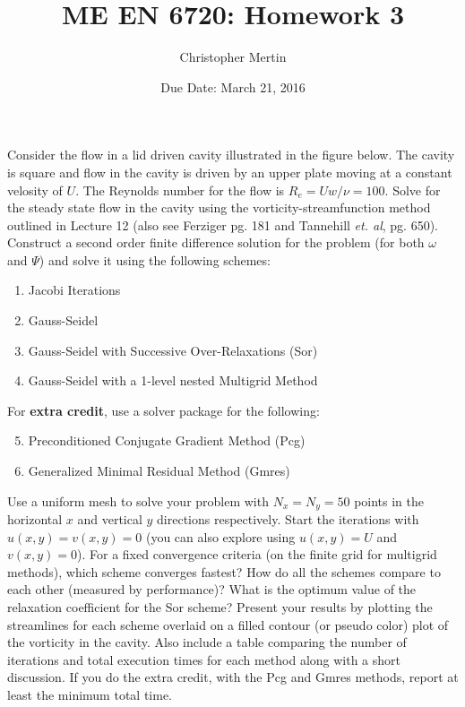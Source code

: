 \documentclass[addpoints]{exam}
\title{ME EN 6720: Homework 3}
\date{Due Date: March 21, 2016}
\author{Christopher Mertin}
\begin{document}
\maketitle

\pointname{}
\bonuspointname{}
\pointformat{[\bfseries\thepoints]}

\printanswers



\begin{questions}
Consider the flow in a lid driven cavity illustrated in the figure below. The cavity is square and flow in the cavity is driven by an upper plate moving at a constant velosity of $U$. The Reynolds number for the flow is $R_{e} = Uw/\nu = 100$. Solve for the steady state flow in the cavity using the vorticity-streamfunction method outlined in Lecture 12 (also see Ferziger pg. 181 and Tannehill {\em et. al}, pg. 650). Construct a second order finite difference solution for the problem (for both $\omega$ and $\Psi$) and solve it using the following schemes:
\begin{enumerate}
\item Jacobi Iterations
\item Gauss-Seidel
\item Gauss-Seidel with Successive Over-Relaxations ({\sc Sor})
\item Gauss-Seidel with a 1-level nested Multigrid Method
\end{enumerate}

For {\bf extra credit}, use a solver package for the following:
\begin{enumerate}
\setcounter{enumi}{4}
\item Preconditioned Conjugate Gradient Method ({\sc Pcg})
\item Generalized Minimal Residual Method ({\sc Gmres})
\end{enumerate}

Use a uniform mesh to solve your problem with $N_{x}=N_{y}=50$ points in the horizontal $x$ and vertical $y$ directions respectively. Start the iterations with $u(x,y)=v(x,y)=0$ (you can also explore using $u(x,y)=U$ and $v(x,y)=0$). For a fixed convergence criteria (on the finite grid for multigrid methods), which scheme converges fastest? How do all the schemes compare to each other (measured by performance)? What is the optimum value of the relaxation coefficient for the {\sc Sor} scheme? Present your results by plotting the streamlines for each scheme overlaid on a filled contour (or pseudo color) plot of the vorticity in the cavity. Also include a table comparing the number of iterations and total execution times for each method along with a short discussion. If you do the extra credit, with the {\sc Pcg} and {\sc Gmres} methods, report at least the minimum total time.


\end{questions}
\end{document}
